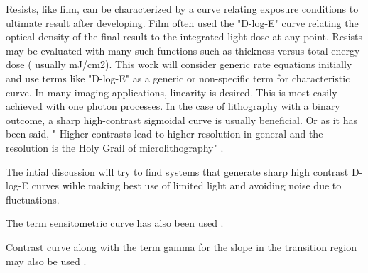Resists, like film, can be characterized by a curve relating exposure
conditions to ultimate result after developing. 
Film often used the "D-log-E" curve relating the optical density of the
final result to the integrated light dose at any point. Resists may 
be evaluated with many such functions such as thickness versus 
total energy dose ( usually mJ/cm2).  This work will consider generic
rate equations initially and use terms like "D-log-E" as a generic
or non-specific term for characteristic curve.  
In many imaging applications, linearity is desired. This is most easily achieved with one photon processes. In the case of lithography with a binary
outcome, a sharp high-contrast sigmoidal curve is usually beneficial. 
Or as it has been said, 
" Higher contrasts lead to
higher resolution in general and the resolution is the Holy Grail of microlithography" \cite{Ito_Chemical_Amplification_Resists_2005}.

The intial discussion will try to find systems that generate sharp
high contrast D-log-E curves wihle making best use of limited light
and avoiding noise due to fluctuations.

The term sensitometric curve has also been used \cite{Zhu_Yoo_Jursinic_Characteristics_sensitometric_curves_2003}.

Contrast curve along with the term gamma for the slope in the transition
region may also be used \cite{Ito_Chemical_Amplification_Resists_2005}.







\mjmtol{ }




















